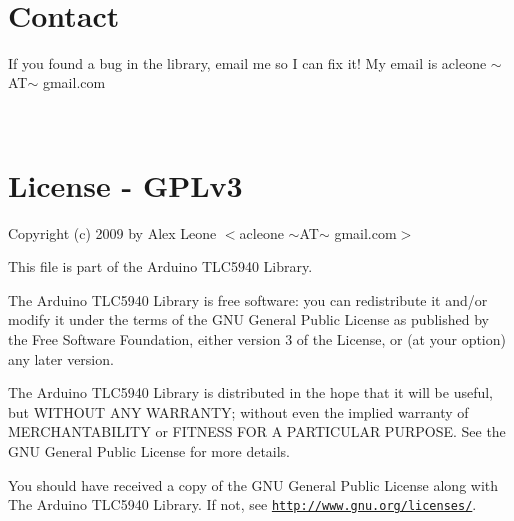 ~\hypertarget{index_bugs}{}\section{Contact}\label{index_bugs}
If you found a bug in the library, email me so I can fix it! My email is acleone $\sim$\+A\+T$\sim$ gmail.\+com

~\hypertarget{index_license}{}\section{License -\/ G\+P\+Lv3}\label{index_license}
Copyright (c) 2009 by Alex Leone $<$acleone $\sim$\+A\+T$\sim$ gmail.\+com$>$

This file is part of the Arduino T\+L\+C5940 Library.

The Arduino T\+L\+C5940 Library is free software\+: you can redistribute it and/or modify it under the terms of the G\+NU General Public License as published by the Free Software Foundation, either version 3 of the License, or (at your option) any later version.

The Arduino T\+L\+C5940 Library is distributed in the hope that it will be useful, but W\+I\+T\+H\+O\+UT A\+NY W\+A\+R\+R\+A\+N\+TY; without even the implied warranty of M\+E\+R\+C\+H\+A\+N\+T\+A\+B\+I\+L\+I\+TY or F\+I\+T\+N\+E\+SS F\+OR A P\+A\+R\+T\+I\+C\+U\+L\+AR P\+U\+R\+P\+O\+SE. See the G\+NU General Public License for more details.

You should have received a copy of the G\+NU General Public License along with The Arduino T\+L\+C5940 Library. If not, see \href{http://www.gnu.org/licenses/}{\tt http\+://www.\+gnu.\+org/licenses/}. 